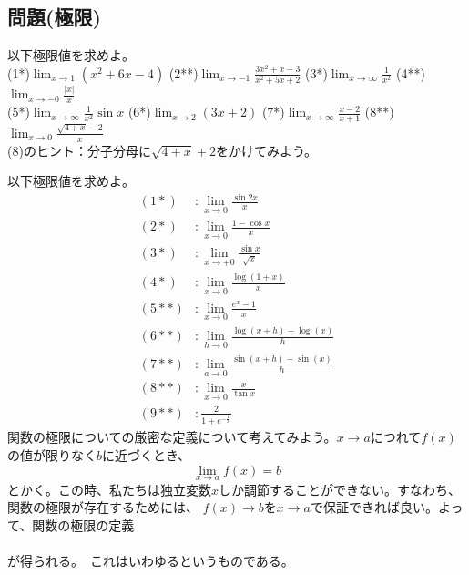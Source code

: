 \documentclass[a4j,dvipdfmx]{jsarticle}
\begin{document}
\subsection*{問題(極限)}
以下極限値を求めよ。\\
(1*)$\lim_{x\to1}(x^2+6x-4)$
\hspace{10mm}
(2**)$\lim_{x\to-1}\frac{3x^2+x-3}{x^2+5x+2}$
\hspace{10mm}
(3*)$\lim_{x\to\infty}\frac{1}{x^2}$
\hspace{10mm}
(4**)$\lim_{x\to-0}\frac{|x|}{x}$
\\
(5*)$\lim_{x\to\infty}\frac{1}{x^2}\sin x$
\hspace{18mm}
(6*)$\lim_{x\to2}(3x+2)$
\hspace{17mm}
(7*)$\lim_{x\to\infty}\frac{x-2}{x+1}$
\hspace{9mm}
(8**)$\lim_{x\to0}\frac{\sqrt{4+x}-2}{x}$
\\
\scriptsize(8)のヒント：分子分母に$\sqrt{4+x}+2$をかけてみよう。\\
\normalsize

以下極限値を求めよ。
\begin{align*}
    (1*)&:\lim_{x\to0}\frac{\sin 2x}{x}\\
    (2*)&:\lim_{x\to0}\frac{1-\cos x}{x}\\
    (3*)&:\lim_{x\to+0}\frac{\sin x}{\sqrt{x}}\\
    (4*)&:\lim_{x\to0}\frac{\log(1+x)}{x}\\
    (5**)&:\lim_{x\to0}\frac{e^x-1}{x}\\
    (6**)&:\lim_{h\to0}\frac{\log(x+h)-\log(x)}{h}\\
    (7**)&:\lim_{a\to0}\frac{\sin(x+h)-\sin(x)}{h}\\
    (8**)&:\lim_{x\to0}\frac{x}{\tan x}\\
    (9**)&:\frac{2}{1+e^{-\frac{1}{x}}}
\end{align*}
関数の極限についての厳密な定義について考えてみよう。$x\to a$につれて$f(x)$の値が限りなく$b$に近づくとき、
\begin{equation*}
    \lim_{x\to a}f(x)=b
\end{equation*}
とかく。この時、私たちは独立変数$x$しか調節することができない。すなわち、関数の極限が存在するためには、
$f(x)\to b$を$x\to a$で保証できれば良い。よって、関数の極限の定義\\
\\
が得られる。　これはいわゆるというものである。
\end{document}
